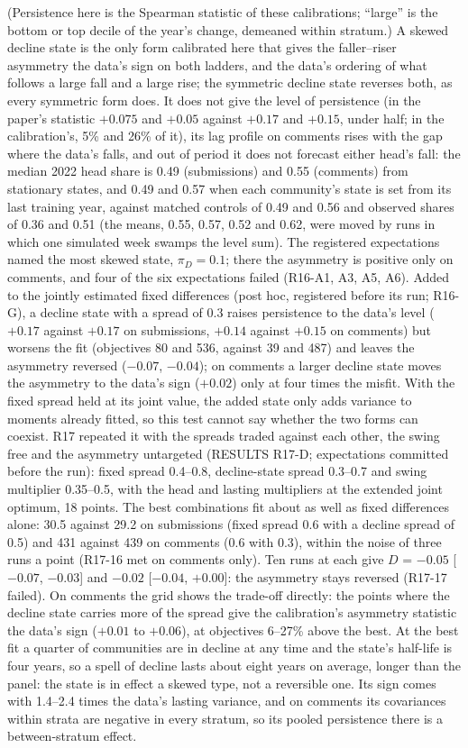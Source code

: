 \documentclass[10pt]{article}
\begin{document}
(Persistence here is the Spearman statistic of these calibrations; ``large'' is the bottom or top decile of the year's change, demeaned within stratum.) A skewed decline state is the only form calibrated here that gives the faller--riser asymmetry the data's sign on both ladders, and the data's ordering of what follows a large fall and a large rise; the symmetric decline state reverses both, as every symmetric form does. It does not give the level of persistence (in the paper's statistic $+0.075$ and $+0.05$ against $+0.17$ and $+0.15$, under half; in the calibration's, 5\% and 26\% of it), its lag profile on comments rises with the gap where the data's falls, and out of period it does not forecast either head's fall: the median 2022 head share is 0.49 (submissions) and 0.55 (comments) from stationary states, and 0.49 and 0.57 when each community's state is set from its last training year, against matched controls of 0.49 and 0.56 and observed shares of 0.36 and 0.51 (the means, 0.55, 0.57, 0.52 and 0.62, were moved by runs in which one simulated week swamps the level sum). The registered expectations named the most skewed state, $\pi_D = 0.1$; there the asymmetry is positive only on comments, and four of the six expectations failed (R16-A1, A3, A5, A6). Added to the jointly estimated fixed differences (post hoc, registered before its run; R16-G), a decline state with a spread of 0.3 raises persistence to the data's level ($+0.17$ against $+0.17$ on submissions, $+0.14$ against $+0.15$ on comments) but worsens the fit (objectives 80 and 536, against 39 and 487) and leaves the asymmetry reversed ($-0.07$, $-0.04$); on comments a larger decline state moves the asymmetry to the data's sign ($+0.02$) only at four times the misfit. With the fixed spread held at its joint value, the added state only adds variance to moments already fitted, so this test cannot say whether the two forms can coexist. R17 repeated it with the spreads traded against each other, the swing free and the asymmetry untargeted (RESULTS R17-D; expectations committed before the run): fixed spread 0.4--0.8, decline-state spread 0.3--0.7 and swing multiplier 0.35--0.5, with the head and lasting multipliers at the extended joint optimum, 18 points. The best combinations fit about as well as fixed differences alone: 30.5 against 29.2 on submissions (fixed spread 0.6 with a decline spread of 0.5) and 431 against 439 on comments (0.6 with 0.3), within the noise of three runs a point (R17-16 met on comments only). Ten runs at each give $D$ = $-0.05$ [$-0.07$, $-0.03$] and $-0.02$ [$-0.04$, $+0.00$]: the asymmetry stays reversed (R17-17 failed). On comments the grid shows the trade-off directly: the points where the decline state carries more of the spread give the calibration's asymmetry statistic the data's sign ($+0.01$ to $+0.06$), at objectives 6--27\% above the best. At the best fit a quarter of communities are in decline at any time and the state's half-life is four years, so a spell of decline lasts about eight years on average, longer than the panel: the state is in effect a skewed type, not a reversible one. Its sign comes with 1.4--2.4 times the data's lasting variance, and on comments its covariances within strata are negative in every stratum, so its pooled persistence there is a between-stratum effect.
\end{document}
